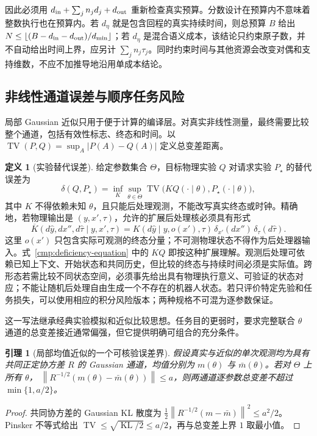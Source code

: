 \documentclass[11pt,a4paper]{article}
\numberwithin{equation}{section}
\newtheorem{lemma}[theorem]{引理}
\theoremstyle{definition}
\newtheorem{definition}[theorem]{定义}
\DeclareMathOperator{\TV}{TV}
\DeclareMathOperator{\KL}{KL}
\newcommand{\norm}[1]{\left\lVert#1\right\rVert}
\newcommand{\abs}[1]{\left\lvert#1\right\rvert}
\begin{document}
因此必须用 $d_{\rm in}+\sum_jn_jd_j+d_{\rm out}$ 重新检查真实预算。分数设计在预算内不意味着整数执行也在预算内。若 $d_\eta$ 就是包含回程的真实持续时间，则总预算 $B$ 给出
$N\le\lfloor(B-d_{\rm in}-d_{\rm out})/d_{\min}\rfloor$；若 $d_\eta$ 是混合语义成本，该结论只约束原子数，并不自动给出时间上界，应另计 $\sum_jn_j\tau_j$。同时约束时间与其他资源会改变对偶和支持维数，不应不加推导地沿用单成本结论。

\subsection{非线性通道误差与顺序任务风险}
\label{cmp:nonlinear}

局部 Gaussian 近似只用于便于计算的编译层。对真实非线性测量，最终需要比较整个通道，包括有效性标志、终态和时间。以
$\TV(P,Q)=\sup_A\abs{P(A)-Q(A)}$
定义总变差距离。

\begin{definition}[实验替代误差]
\label{cmp:deficiency}
给定参数集合 $\Theta$，目标物理实验 $Q$ 对请求实验 $P_\star$ 的替代误差为
\begin{equation}
 \delta(Q,P_\star)
 =\inf_K\sup_{\theta\in\Theta}
   \TV\bigl(KQ(\cdot\mid\theta),P_\star(\cdot\mid\theta)\bigr),
 \label{cmp:deficiency-equation}
\end{equation}
其中 $K$ 不得依赖未知 $\theta$，且只能后处理观测，不能改写真实终态或时钟。精确地，若物理输出是 $(y,x',\tau)$，允许的扩展后处理核必须具有形式
\begin{equation}
 \overline K(d\widehat y,dx'',d\widehat\tau\mid y,x',\tau)
 =K(d\widehat y\mid y,o(x'),\tau)\,
   \delta_{x'}(dx'')\,\delta_{\tau}(d\widehat\tau).
 \label{cmp:state-preserving-kernel}
\end{equation}
这里 $o(x')$ 只包含实际可观测的终态分量；不可测物理状态不得作为后处理器输入。式~\eqref{cmp:deficiency-equation} 中的 $KQ$ 即按这种扩展理解。观测后处理可依赖已知上下文、开始状态和共同历史，但比较的终态与持续时间必须是实际值。跨形态若需比较不同状态空间，必须事先给出具有物理执行意义、可验证的状态对应；不能让随机后处理自由生成一个不存在的机器人状态。若只评价特定先验和任务损失，可以使用相应的积分风险版本；两种规格不可混为逐参数保证。
\end{definition}

这一写法继承经典实验模拟和近似比较思想\cite{blackwell1953,lecam1964}。任务目的更弱时，要求完整联合 $\theta$ 通道的总变差接近通常偏强，但它提供明确可组合的充分条件。

\begin{lemma}[局部均值近似的一个可核验误差界]
\label{cmp:linearization-error}
假设真实与近似的单次观测均为具有共同正定协方差 $R$ 的 Gaussian 通道，均值分别为 $m(\theta)$ 与 $\bar m(\theta)$。若对 $\Theta$ 上所有 $\theta$，
$\norm{R^{-1/2}(m(\theta)-\bar m(\theta))}\le a$，则两通道逐参数总变差不超过 $\min\{1,a/2\}$。
\end{lemma}
\begin{proof}
共同协方差的 Gaussian KL 散度为
$\tfrac12\norm{R^{-1/2}(m-\bar m)}^2\le a^2/2$。
Pinsker 不等式\cite{tsybakov2009}给出 $\TV\le\sqrt{\KL/2}\le a/2$，再与总变差上界 $1$ 取最小值。
\end{proof}
\end{document}
